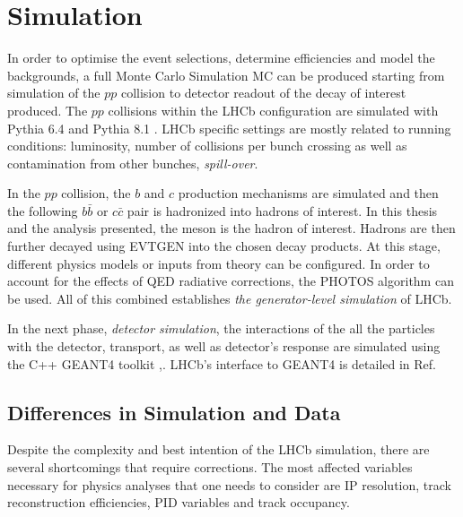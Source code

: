 \section{Simulation }
\label{simulationchap}
In order to optimise the event selections, determine efficiencies and model the backgrounds, a full Monte Carlo Simulation \Gls{MC} can be produced starting from simulation of the $pp$ collision to detector readout of the decay of interest produced. 
The $pp$ collisions within the \Gls{LHCb} configuration \cite{Belyaev:2011zza} are simulated with Pythia 6.4 \cite{pythia6} and Pythia 8.1 \cite{pythia8}. \Gls{LHCb} specific settings are mostly related to running conditions: luminosity, number of collisions per bunch crossing as well as contamination from other bunches, \textit{spill-over}. 

In the $pp$ collision, the $b$ and $c$ production mechanisms are simulated and then the following $b\bar{b}$ or $c\bar{c}$ pair is hadronized into hadrons of interest. In this thesis and the analysis presented, the \Bp meson is the hadron of interest. Hadrons are then further decayed using EVTGEN \cite{Lange:2001uf} into the chosen decay products. At this stage, different physics models or inputs from theory can be configured. %
In order to account for the effects of \Gls{QED} radiative corrections, the PHOTOS \cite{photos} algorithm can be used. All of this combined establishes \textit{the generator-level simulation} of LHCb.


In the next phase, \textit{detector simulation}, the interactions of the all the particles with the detector, transport, as well as detector's response are simulated using the C++ GEANT4 toolkit \cite{Geant4},\cite{Agostinelli:2002hh}. \Gls{LHCb}'s interface to GEANT4 is detailed in Ref\cite{Clemencic:2011zza}. 

\subsection{Differences in Simulation and Data}
\label{detpid}
Despite the complexity and best intention of the \Gls{LHCb} simulation, there are several shortcomings that require corrections.
The most affected variables necessary for physics analyses that one needs to consider are \Gls{IP} resolution, track reconstruction efficiencies, \Gls{PID} variables and track occupancy.

